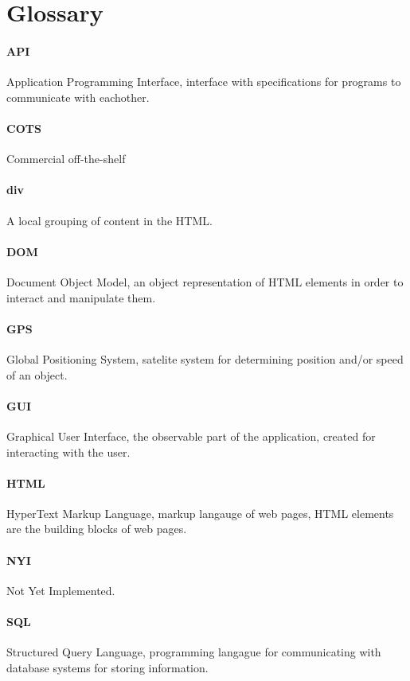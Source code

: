 \section{Glossary}

\paragraph{API} Application Programming Interface, interface with specifications for programs to communicate with eachother.

\paragraph{COTS} Commercial off-the-shelf

\paragraph{div} A local grouping of content in the HTML.

\paragraph{DOM} Document Object Model, an object representation of HTML elements in order to interact and manipulate them.

\paragraph{GPS} Global Positioning System, satelite system for determining position and/or speed of an object.

\paragraph{GUI} Graphical User Interface, the observable part of the application, created for interacting with the user.

\paragraph{HTML} HyperText Markup Language, markup langauge of web pages, HTML elements are the building blocks of web pages.

\paragraph{NYI} Not Yet Implemented.

\paragraph{SQL} Structured Query Language, programming langague for communicating with database systems for storing information.
